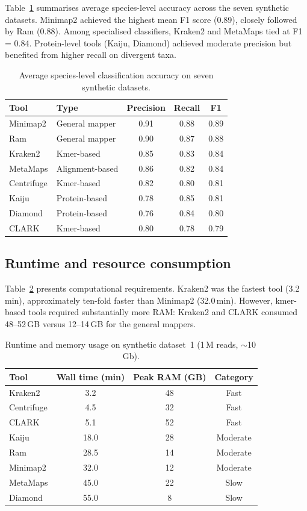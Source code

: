 \documentclass[12pt]{article}
\begin{document}
Table~\ref{tab:accuracy} summarises average species-level accuracy across the seven synthetic datasets. Minimap2 achieved the highest mean F1 score (0.89), closely followed by Ram (0.88). Among specialised classifiers, Kraken2 and MetaMaps tied at F1 = 0.84. Protein-level tools (Kaiju, Diamond) achieved moderate precision but benefited from higher recall on divergent taxa.

\begin{table}[ht]
\centering
\caption{Average species-level classification accuracy on seven synthetic datasets.}
\label{tab:accuracy}
\begin{tabular}{llccc}
\toprule
Tool & Type & Precision & Recall & F1 \\
\midrule
Minimap2 & General mapper & 0.91 & 0.88 & 0.89 \\
Ram & General mapper & 0.90 & 0.87 & 0.88 \\
Kraken2 & Kmer-based & 0.85 & 0.83 & 0.84 \\
MetaMaps & Alignment-based & 0.86 & 0.82 & 0.84 \\
Centrifuge & Kmer-based & 0.82 & 0.80 & 0.81 \\
Kaiju & Protein-based & 0.78 & 0.85 & 0.81 \\
Diamond & Protein-based & 0.76 & 0.84 & 0.80 \\
CLARK & Kmer-based & 0.80 & 0.78 & 0.79 \\
\bottomrule
\end{tabular}
\end{table}

\subsection{Runtime and resource consumption}

Table~\ref{tab:resources} presents computational requirements. Kraken2 was the fastest tool (3.2\,min), approximately ten-fold faster than Minimap2 (32.0\,min). However, kmer-based tools required substantially more RAM: Kraken2 and CLARK consumed 48--52\,GB versus 12--14\,GB for the general mappers.

\begin{table}[ht]
\centering
\caption{Runtime and memory usage on synthetic dataset~1 (1\,M reads, $\sim$10\,Gb).}
\label{tab:resources}
\begin{tabular}{lccc}
\toprule
Tool & Wall time (min) & Peak RAM (GB) & Category \\
\midrule
Kraken2 & 3.2 & 48 & Fast \\
Centrifuge & 4.5 & 32 & Fast \\
CLARK & 5.1 & 52 & Fast \\
Kaiju & 18.0 & 28 & Moderate \\
Ram & 28.5 & 14 & Moderate \\
Minimap2 & 32.0 & 12 & Moderate \\
MetaMaps & 45.0 & 22 & Slow \\
Diamond & 55.0 & 8 & Slow \\
\bottomrule
\end{tabular}
\end{table}
\end{document}
